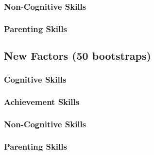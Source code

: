 \documentclass[11pt]{article}
\begin{document}
    \subsubsection{Non-Cognitive Skills}
    

    \subsubsection{Parenting Skills}
    

  \subsection{New Factors (50 bootstraps)}
    \subsubsection{Cognitive Skills}
    

    \subsubsection{Achievement Skills}
    

    \subsubsection{Non-Cognitive Skills}
    

    \subsubsection{Parenting Skills}
    
\end{document}
